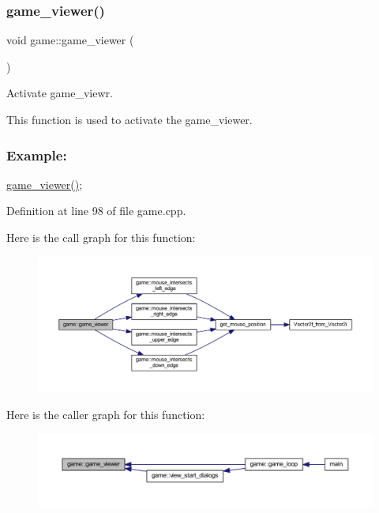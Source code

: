 \subsubsection{\texorpdfstring{game\+\_\+viewer()}{game\_viewer()}}
{\footnotesize\ttfamily void game\+::game\+\_\+viewer (\begin{DoxyParamCaption}{ }\end{DoxyParamCaption})\hspace{0.3cm}{\ttfamily [private]}}



Activate game\+\_\+viewr. 

This function is used to activate the game\+\_\+viewer. ~\newline
 \subsubsection*{Example\+: }

\hyperlink{classgame_a69793e75c155cb06e4f2c4d98c5da27c}{game\+\_\+viewer()}; 

Definition at line 98 of file game.\+cpp.

Here is the call graph for this function\+:
\nopagebreak
\begin{figure}[H]
\begin{center}
\leavevmode
\includegraphics[width=350pt]{classgame_a69793e75c155cb06e4f2c4d98c5da27c_cgraph}
\end{center}
\end{figure}
Here is the caller graph for this function\+:
\nopagebreak
\begin{figure}[H]
\begin{center}
\leavevmode
\includegraphics[width=350pt]{classgame_a69793e75c155cb06e4f2c4d98c5da27c_icgraph}
\end{center}
\end{figure}
\mbox{\label{classgame_a0eb06f984d04128ba7fba6fcca04bda3}} 
